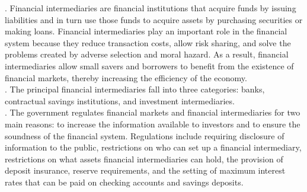 \documentclass[12pt]{article}
\begin{document}
. Financial intermediaries are financial institutions that acquire funds by issuing liabilities and in turn use those funds to acquire assets by 
purchasing securities or making loans. Financial intermediaries play an important role in the financial system because they reduce transaction costs, 
allow risk sharing, and solve the problems created by adverse selection and moral hazard. As a result, financial intermediaries allow small savers and 
borrowers to benefit from the existence of financial markets, thereby increasing the efficiency of the economy.\\

. The principal financial intermediaries fall into three categories: banks, contractual savings institutions, and investment intermediaries.\\

. The government regulates financial markets and financial intermediaries for two main reasons: to increase the information available to investors 
and to ensure the soundness of the financial system. Regulations include requiring disclosure of information to the public, restrictions on 
who can set up a financial intermediary, restrictions on what assets financial intermediaries can hold, the provision of deposit insurance, 
reserve requirements, and the setting of maximum interest rates that can be paid on checking accounts and savings deposits.\\
\end{document}
